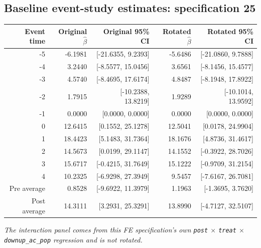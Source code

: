 \documentclass[10pt]{article}
\begin{document}
\subsection*{Baseline event-study estimates: specification 25}
\begin{center}
\scriptsize
\begin{tabular}{r rr rr}
\toprule
Event time & Original $\hat\beta$ & Original 95\% CI & Rotated $\hat\beta$ & Rotated 95\% CI \\
\midrule
-5 & -6.1981 & [-21.6355, 9.2393] & -5.6486 & [-21.0860, 9.7888] \\
-4 & 3.2440 & [-8.5577, 15.0456] & 3.6561 & [-8.1456, 15.4577] \\
-3 & 4.5740 & [-8.4695, 17.6174] & 4.8487 & [-8.1948, 17.8922] \\
-2 & 1.7915 & [-10.2388, 13.8219] & 1.9289 & [-10.1014, 13.9592] \\
-1 & 0.0000 & [0.0000, 0.0000] & 0.0000 & [0.0000, 0.0000] \\
0 & 12.6415 & [0.1552, 25.1278] & 12.5041 & [0.0178, 24.9904] \\
1 & 18.4423 & [5.1483, 31.7364] & 18.1676 & [4.8736, 31.4617] \\
2 & 14.5673 & [0.0199, 29.1147] & 14.1552 & [-0.3922, 28.7026] \\
3 & 15.6717 & [-0.4215, 31.7649] & 15.1222 & [-0.9709, 31.2154] \\
4 & 10.2325 & [-6.9298, 27.3949] & 9.5457 & [-7.6167, 26.7081] \\
\midrule
Pre average & 0.8528 & [-9.6922, 11.3979] & 1.1963 & [-1.3695, 3.7620] \\
Post average & 14.3111 & [3.2931, 25.3291] & 13.8990 & [-4.7127, 32.5107] \\
\bottomrule
\end{tabular}
\end{center}
\medskip
\textit{The interaction panel comes from this FE specification's own \texttt{post} $\times$ \texttt{treat} $\times$ \texttt{downup\_ac\_pop} regression and is not rotated.}
\clearpage
\end{document}
